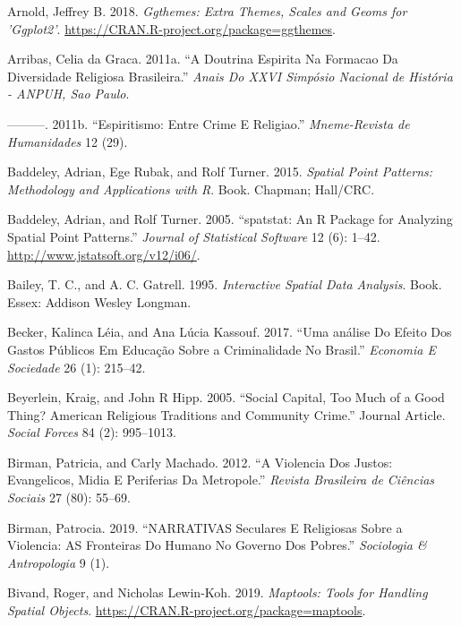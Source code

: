 \documentclass[smallextended]{svjour3}       %
\begin{document}
\leavevmode\hypertarget{ref-Arnold2018}{}%
Arnold, Jeffrey B. 2018. \emph{Ggthemes: Extra Themes, Scales and Geoms
for 'Ggplot2'}. \url{https://CRAN.R-project.org/package=ggthemes}.

\leavevmode\hypertarget{ref-Arribas2011doutrina}{}%
Arribas, Celia da Graca. 2011a. ``A Doutrina Espirita Na Formacao Da
Diversidade Religiosa Brasileira.'' \emph{Anais Do XXVI Simpósio
Nacional de História - ANPUH, Sao Paulo}.

\leavevmode\hypertarget{ref-Arribas2011espiritismo}{}%
---------. 2011b. ``Espiritismo: Entre Crime E Religiao.''
\emph{Mneme-Revista de Humanidades} 12 (29).

\leavevmode\hypertarget{ref-Baddeley2015spatial}{}%
Baddeley, Adrian, Ege Rubak, and Rolf Turner. 2015. \emph{Spatial Point
Patterns: Methodology and Applications with R}. Book. Chapman; Hall/CRC.

\leavevmode\hypertarget{ref-Baddeley2005spatstat}{}%
Baddeley, Adrian, and Rolf Turner. 2005. ``spatstat: An R Package for
Analyzing Spatial Point Patterns.'' \emph{Journal of Statistical
Software} 12 (6): 1--42. \url{http://www.jstatsoft.org/v12/i06/}.

\leavevmode\hypertarget{ref-Bailey1995interactive}{}%
Bailey, T. C., and A. C. Gatrell. 1995. \emph{Interactive Spatial Data
Analysis}. Book. Essex: Addison Wesley Longman.

\leavevmode\hypertarget{ref-Becker2017analise}{}%
Becker, Kalinca Léia, and Ana Lúcia Kassouf. 2017. ``Uma análise Do
Efeito Dos Gastos Públicos Em Educação Sobre a Criminalidade No
Brasil.'' \emph{Economia E Sociedade} 26 (1): 215--42.

\leavevmode\hypertarget{ref-Beyerlein2005social}{}%
Beyerlein, Kraig, and John R Hipp. 2005. ``Social Capital, Too Much of a
Good Thing? American Religious Traditions and Community Crime.'' Journal
Article. \emph{Social Forces} 84 (2): 995--1013.

\leavevmode\hypertarget{ref-Birman2012violencia}{}%
Birman, Patricia, and Carly Machado. 2012. ``A Violencia Dos Justos:
Evangelicos, Midia E Periferias Da Metropole.'' \emph{Revista Brasileira
de Ciências Sociais} 27 (80): 55--69.

\leavevmode\hypertarget{ref-Birman2019narrativas}{}%
Birman, Patrocia. 2019. ``NARRATIVAS Seculares E Religiosas Sobre a
Violencia: AS Fronteiras Do Humano No Governo Dos Pobres.''
\emph{Sociologia \& Antropologia} 9 (1).

\leavevmode\hypertarget{ref-Bivand2019maptools}{}%
Bivand, Roger, and Nicholas Lewin-Koh. 2019. \emph{Maptools: Tools for
Handling Spatial Objects}.
\url{https://CRAN.R-project.org/package=maptools}.
\end{document}
